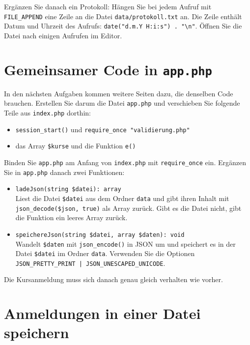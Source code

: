 \documentclass[a4paper,12pt]{article}
\begin{document}
Ergänzen Sie danach ein Protokoll: Hängen Sie bei jedem Aufruf mit \texttt{FILE\_APPEND} eine Zeile an die Datei \texttt{data/protokoll.txt} an. Die Zeile enthält Datum und Uhrzeit des Aufrufs: \texttt{date("{}d.m.Y H:i:s"{}) . "{}\textbackslash{}n"{}}. Öffnen Sie die Datei nach einigen Aufrufen im Editor.

\section{Gemeinsamer Code in \texttt{app.php}}

In den nächsten Aufgaben kommen weitere Seiten dazu, die denselben Code brauchen. Erstellen Sie darum die Datei \texttt{app.php} und verschieben Sie folgende Teile aus \texttt{index.php} dorthin:

\begin{itemize}
    \item \texttt{session\_start()} und \texttt{require\_once "{}validierung.php"{}}
    \item das Array \texttt{\$kurse} und die Funktion \texttt{e()}
\end{itemize}

Binden Sie \texttt{app.php} am Anfang von \texttt{index.php} mit \texttt{require\_once} ein. Ergänzen Sie in \texttt{app.php} danach zwei Funktionen:

\begin{itemize}
    \item \texttt{ladeJson(string \$datei): array}\\
    Liest die Datei \texttt{\$datei} aus dem Ordner \texttt{data} und gibt ihren Inhalt mit \texttt{json\_decode(\$json, true)} als Array zurück. Gibt es die Datei nicht, gibt die Funktion ein leeres Array zurück.
    \item \texttt{speichereJson(string \$datei, array \$daten): void}\\
    Wandelt \texttt{\$daten} mit \texttt{json\_encode()} in JSON um und speichert es in der Datei \texttt{\$datei} im Ordner \texttt{data}. Verwenden Sie die Optionen \texttt{JSON\_PRETTY\_PRINT | JSON\_UNESCAPED\_UNICODE}.
\end{itemize}

Die Kursanmeldung muss sich danach genau gleich verhalten wie vorher.

\section{Anmeldungen in einer Datei speichern}
\end{document}
